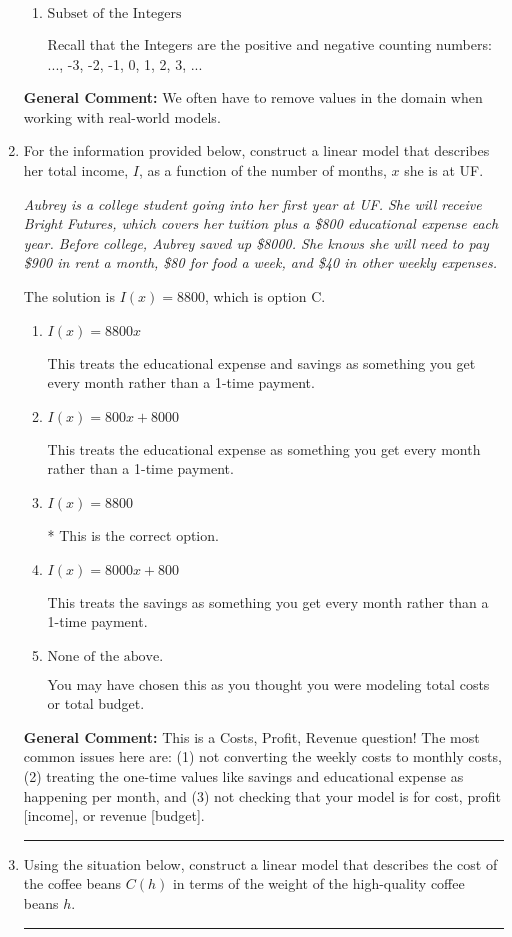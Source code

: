 \documentclass{extbook}[14pt]
\newcommand{\litem}[1]{\item #1

\rule{\textwidth}{0.4pt}}
\begin{document}
\begin{enumerate}
{\begin{enumerate}[label=\Alph*.]
This means we have a domain of the Real numbers but need to throw out values based on the context.
\item \( \text{Subset of the Integers} \)

Recall that the Integers are the positive and negative counting numbers: ..., -3, -2, -1, 0, 1, 2, 3, ... 
\end{enumerate}

\textbf{General Comment:} We often have to remove values in the domain when working with real-world models.
}
\litem{
For the information provided below, construct a linear model that describes her total income, $I$, as a function of the number of months, $x$ she is at UF.

\begin{center}
    \textit{ Aubrey is a college student going into her first year at UF. She will receive Bright Futures, which covers her tuition plus a \$800 educational expense each year. Before college, Aubrey saved up \$8000. She knows she will need to pay \$900 in rent a month, \$80 for food a week, and \$40 in other weekly expenses. }
\end{center}
The solution is \( I(x) = 8800 \), which is option C.\begin{enumerate}[label=\Alph*.]
\item \( I(x) = 8800 x \)

This treats the educational expense and savings as something you get every month rather than a 1-time payment.
\item \( I(x) = 800 x + 8000 \)

This treats the educational expense as something you get every month rather than a 1-time payment.
\item \( I(x) = 8800 \)

* This is the correct option.
\item \( I(x) = 8000 x + 800 \)

This treats the savings as something you get every month rather than a 1-time payment.
\item \( \text{None of the above.} \)

You may have chosen this as you thought you were modeling total costs or total budget.
\end{enumerate}

\textbf{General Comment:} This is a Costs, Profit, Revenue question! The most common issues here are: (1) not converting the weekly costs to monthly costs, (2) treating the one-time values like savings and educational expense as happening per month, and (3) not checking that your model is for cost, profit [income], or revenue [budget].
}
\litem{
Using the situation below, construct a linear model that describes the cost of the coffee beans $C(h)$ in terms of the weight of the high-quality coffee beans $h$.

}
\end{enumerate}
\end{document}
